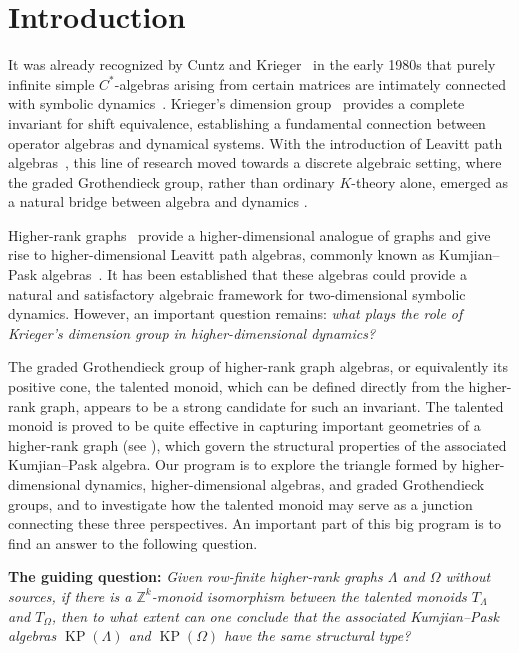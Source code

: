 \documentclass[a4paper,reqno,12pt]{amsart}
\numberwithin{equation}{section}
\theoremstyle{definition}
\theoremstyle{remark}
\begin{document}
\maketitle

\tableofcontents

\section{Introduction}\label{sec intro}

It was already recognized by Cuntz and Krieger~\cite{cuntzkrieger} in the early 1980s that purely infinite simple $C^*$-algebras arising from certain matrices are intimately connected with symbolic dynamics~\cite{LindMarcus}. Krieger’s dimension group~\cite{krieger1} provides a complete invariant for shift equivalence, establishing a fundamental connection between operator algebras and dynamical systems. With the introduction of Leavitt path algebras~\cite{lpabook}, this line of research moved towards a discrete algebraic setting, where the graded Grothendieck group, rather than ordinary \(K\)-theory alone, emerged as a natural bridge between algebra and dynamics \cite{haz2013,Hazrat-main}. 

Higher-rank graphs~\cite{KumjianPask} provide a higher-dimensional analogue of graphs and give rise to higher-dimensional Leavitt path algebras, commonly known as Kumjian--Pask algebras~\cite{Pino}. It has been established that these algebras could provide a natural and satisfactory algebraic framework for two-dimensional symbolic dynamics. However, an important question remains: \emph{what plays the role of Krieger’s dimension group in higher-dimensional dynamics?}

The graded Grothendieck group of higher-rank graph algebras, or equivalently its positive cone, the talented monoid, which can be defined directly from the higher-rank graph, appears to be a strong candidate for such an invariant. The talented monoid is proved to be quite effective in capturing important geometries of a higher-rank graph  (see \cite{HMPS1,HLM}), which govern the structural properties of the associated Kumjian--Pask algebra. Our program is to explore the triangle formed by higher-dimensional dynamics, higher-dimensional algebras, and graded Grothendieck groups, and to investigate how the talented monoid may serve as a junction connecting these three perspectives. An important part of this big program is to find an answer to the following question.  

\textbf{The guiding question:} \emph{Given row-finite higher-rank graphs $\Lambda$ and $\Omega$ without sources, if there is a $\mathbb Z^k$-monoid isomorphism between the talented monoids $T_\Lambda$ and $T_\Omega$, then to what extent can one conclude that the associated Kumjian--Pask algebras $\operatorname{KP}(\Lambda)$ and $\operatorname{KP}(\Omega)$ have the same structural type?} 
\end{document}
